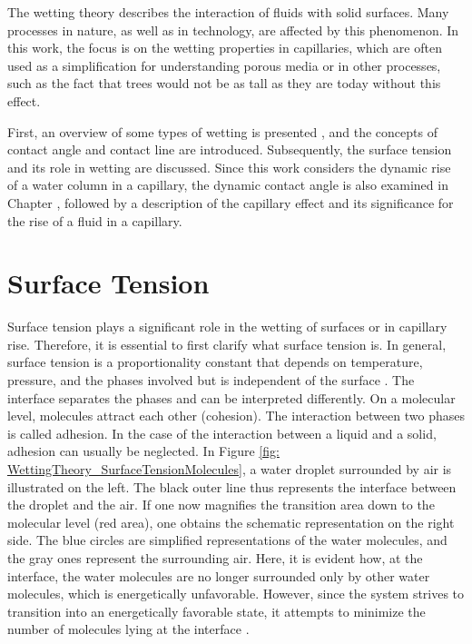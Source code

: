 The wetting theory describes the interaction of fluids with solid surfaces. Many processes in nature, as well as in technology, are affected by this phenomenon. In this work, the focus is on the wetting properties in capillaries, which are often used as a simplification for understanding porous media or in other processes, such as the fact that trees would not be as tall as they are today without this effect. 

First, an overview of some types of wetting is presented , and the concepts of contact angle and contact line are introduced. Subsequently, the surface tension  and its role in wetting are discussed. Since this work considers the dynamic rise of a water column in a capillary, the dynamic contact angle is also examined in Chapter , followed by a description of the capillary effect  and its significance for the rise of a fluid in a capillary. 

\section{Surface Tension}
\label{sec: Wetting_SurfaceTension}
Surface tension plays a significant role in the wetting of surfaces or in capillary rise. Therefore, it is essential to first clarify what surface tension is. In general, surface tension is a proportionality constant that depends on temperature, pressure, and the phases involved but is independent of the surface \cite{buttPhysicsChemistryInterfaces}. The interface separates the phases and can be interpreted differently. 
On a molecular level, molecules attract each other (cohesion). The interaction between two phases is called adhesion. In the case of the interaction between a liquid and a solid, adhesion can usually be neglected. In Figure \ref{fig: WettingTheory_SurfaceTensionMolecules}, a water droplet surrounded by air is illustrated on the left. The black outer line thus represents the interface between the droplet and the air. If one now magnifies the transition area down to the molecular level (red area), one obtains the schematic representation on the right side. The blue circles are simplified representations of the water molecules, and the gray ones represent the surrounding air. Here, it is evident how, at the interface, the water molecules are no longer surrounded only by other water molecules, which is energetically unfavorable. However, since the system strives to transition into an energetically favorable state, it attempts to minimize the number of molecules lying at the interface \cite{buttPhysicsChemistryInterfaces}.

